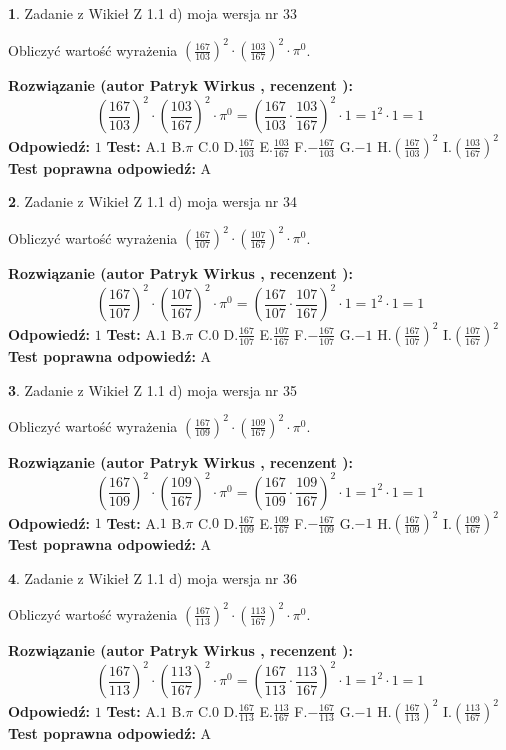 \documentclass[12pt, a4paper]{article}
\theoremstyle{definition} %
\newtheorem{zad}{}
\newcommand{\zadStart}[1]{\begin{zad}#1\newline}
\newcommand{\zadStop}{\end{zad}}
\newcommand{\rozwStart}[2]{\noindent \textbf{Rozwiązanie (autor #1 , recenzent #2): }\newline}
\newcommand{\rozwStop}{\newline}
\newcommand{\odpStart}{\noindent \textbf{Odpowiedź:}\newline}
\newcommand{\odpStop}{\newline}
\newcommand{\testStart}{\noindent \textbf{Test:}\newline}
\newcommand{\testStop}{\newline}
\newcommand{\kluczStart}{\noindent \textbf{Test poprawna odpowiedź:}\newline}
\newcommand{\kluczStop}{\newline}
\begin{document}
\zadStart{Zadanie z Wikieł Z 1.1 d) moja wersja nr 33}

Obliczyć wartość wyrażenia $(\frac{167}{103})^{2} \cdot (\frac{103}{167})^{2} \cdot \pi^{0}$.
\zadStop
\rozwStart{Patryk Wirkus}{}
$$(\frac{167}{103})^{2} \cdot (\frac{103}{167})^{2} \cdot \pi^{0} = (\frac{167}{103} \cdot \frac{103}{167})^{2} \cdot 1 = 1^{2} \cdot 1 = 1$$
\rozwStop
\odpStart
$1$
\odpStop
\testStart
A.$1$ B.$\pi$ C.$0$ D.$\frac{167}{103}$ E.$\frac{103}{167}$
F.$-\frac{167}{103}$ G.$-1$
H.$(\frac{167}{103})^{2}$
I.$(\frac{103}{167})^{2}$
\testStop
\kluczStart
A
\kluczStop



\zadStart{Zadanie z Wikieł Z 1.1 d) moja wersja nr 34}

Obliczyć wartość wyrażenia $(\frac{167}{107})^{2} \cdot (\frac{107}{167})^{2} \cdot \pi^{0}$.
\zadStop
\rozwStart{Patryk Wirkus}{}
$$(\frac{167}{107})^{2} \cdot (\frac{107}{167})^{2} \cdot \pi^{0} = (\frac{167}{107} \cdot \frac{107}{167})^{2} \cdot 1 = 1^{2} \cdot 1 = 1$$
\rozwStop
\odpStart
$1$
\odpStop
\testStart
A.$1$ B.$\pi$ C.$0$ D.$\frac{167}{107}$ E.$\frac{107}{167}$
F.$-\frac{167}{107}$ G.$-1$
H.$(\frac{167}{107})^{2}$
I.$(\frac{107}{167})^{2}$
\testStop
\kluczStart
A
\kluczStop



\zadStart{Zadanie z Wikieł Z 1.1 d) moja wersja nr 35}

Obliczyć wartość wyrażenia $(\frac{167}{109})^{2} \cdot (\frac{109}{167})^{2} \cdot \pi^{0}$.
\zadStop
\rozwStart{Patryk Wirkus}{}
$$(\frac{167}{109})^{2} \cdot (\frac{109}{167})^{2} \cdot \pi^{0} = (\frac{167}{109} \cdot \frac{109}{167})^{2} \cdot 1 = 1^{2} \cdot 1 = 1$$
\rozwStop
\odpStart
$1$
\odpStop
\testStart
A.$1$ B.$\pi$ C.$0$ D.$\frac{167}{109}$ E.$\frac{109}{167}$
F.$-\frac{167}{109}$ G.$-1$
H.$(\frac{167}{109})^{2}$
I.$(\frac{109}{167})^{2}$
\testStop
\kluczStart
A
\kluczStop



\zadStart{Zadanie z Wikieł Z 1.1 d) moja wersja nr 36}

Obliczyć wartość wyrażenia $(\frac{167}{113})^{2} \cdot (\frac{113}{167})^{2} \cdot \pi^{0}$.
\zadStop
\rozwStart{Patryk Wirkus}{}
$$(\frac{167}{113})^{2} \cdot (\frac{113}{167})^{2} \cdot \pi^{0} = (\frac{167}{113} \cdot \frac{113}{167})^{2} \cdot 1 = 1^{2} \cdot 1 = 1$$
\rozwStop
\odpStart
$1$
\odpStop
\testStart
A.$1$ B.$\pi$ C.$0$ D.$\frac{167}{113}$ E.$\frac{113}{167}$
F.$-\frac{167}{113}$ G.$-1$
H.$(\frac{167}{113})^{2}$
I.$(\frac{113}{167})^{2}$
\testStop
\kluczStart
A
\kluczStop
\end{document}
